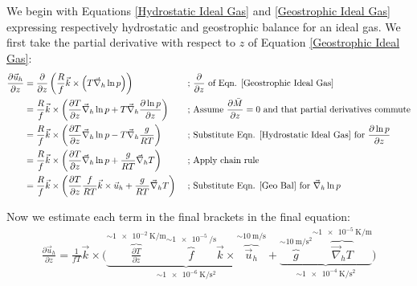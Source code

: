 We begin with Equations \ref{Hydrostatic Ideal Gas} and \ref{Geostrophic Ideal Gas} expressing respectively hydrostatic and geostrophic balance for an ideal gas. We first take the partial derivative with respect to \(z\) of Equation \ref{Geostrophic Ideal Gas}:
\begin{align*}
    \frac{\partial\vec{u}_h}{\partial z}&=\frac{\partial}{\partial z} \left( \frac{R}{f}\vec{k}\times \left( T\vec{\nabla}_h \ln p \right) \right)
    &
    \text{ ; }
    &
    \frac{\partial}{\partial z}\text{ of Eqn. \ref{Geostrophic Ideal Gas}}
    \\
    &=\frac{R}{f}\vec{k}\times\left( 
        \frac{\partial T}{\partial z}\vec{\nabla}_h \ln p
        +
        T\vec{\nabla}_h \frac{\partial \ln p}{\partial z}
     \right)
    &
    \text{ ; }
    &
    \text{Assume }\frac{\partial \bar{M}}{\partial z}=0\text{ and that partial derivatives commute}
    \\
    &=\frac{R}{f}\vec{k}\times\left( 
        \frac{\partial T}{\partial z}\vec{\nabla}_h \ln p
        -
        T\vec{\nabla}_h \frac{g}{RT}
    \right)
    &
    \text{ ; }
    &
    \text{Substitute Eqn. \ref{Hydrostatic Ideal Gas} for }\frac{\partial \ln p}{\partial z}
    \\
    &=\frac{R}{f}\vec{k}\times\left( 
        \frac{\partial T}{\partial z}\vec{\nabla}_h \ln p
        +
        \frac{g}{RT}
        \vec{\nabla}_h T
    \right)
    &
    \text{ ; }
    &
    \text{Apply chain rule}
    \\
    &=\frac{R}{f}\vec{k}\times\left( 
        \frac{\partial T}{\partial z}\frac{f}{RT} \vec{k}\times\vec{u}_h
        +
        \frac{g}{RT}
        \vec{\nabla}_h T
    \right)
    &
    \text{ ; }
    &
    \text{Substitute Eqn. \ref{Geo Bal} for }\vec{\nabla}_h\ln p
\end{align*}

Now we estimate each term in the final brackets in the final equation:
\begin{align*}
    \frac{\partial \vec{u}_h}{\partial z}=\frac{1}{fT}\vec{k}\times\biggl( 
        \underbrace{\overbrace{\frac{\partial T}{\partial z}}^{\sim\qty{1e-2}{\kelvin\per\meter}}
        \overbrace{f}^{\sim\qty{1e-5}{\per\second}}
        \vec{k}\times
        \overbrace{\vec{u}_h}^{\sim\qty{10}{\meter\per\second}}}_{\sim \qty{1e-6}{\kelvin\per\square\second}}
        +
        \underbrace{\overbrace{g}^{\sim\qty{10}{\meter\per\square\second}}
        \overbrace{\vec{\nabla}_h T}^{\sim\qty{1e-5}{\kelvin\per\meter}}}_{\sim\qty{1e-4}{\kelvin\per\square\second}}
    \biggr)
\end{align*}


